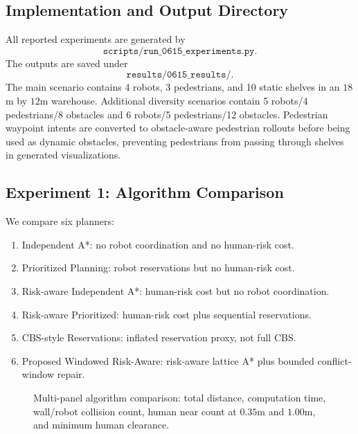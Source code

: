 \documentclass[10pt,twocolumn,letterpaper]{article}
\begin{document}
\subsection{Implementation and Output Directory}
All reported experiments are generated by
\begin{equation}
    \texttt{scripts/run\_0615\_experiments.py}.
\end{equation}
The outputs are saved under
\begin{equation}
    \texttt{results/0615\_results/}.
\end{equation}
The main scenario contains 4 robots, 3 pedestrians, and 10 static shelves in an $18$m by $12$m warehouse. Additional diversity scenarios contain 5 robots/4 pedestrians/8 obstacles and 6 robots/5 pedestrians/12 obstacles. Pedestrian waypoint intents are converted to obstacle-aware pedestrian rollouts before being used as dynamic obstacles, preventing pedestrians from passing through shelves in generated visualizations.

\subsection{Experiment 1: Algorithm Comparison}
We compare six planners:
\begin{enumerate}
    \item Independent A*: no robot coordination and no human-risk cost.
    \item Prioritized Planning: robot reservations but no human-risk cost.
    \item Risk-aware Independent A*: human-risk cost but no robot coordination.
    \item Risk-aware Prioritized: human-risk cost plus sequential reservations.
    \item CBS-style Reservations: inflated reservation proxy, not full CBS.
    \item Proposed Windowed Risk-Aware: risk-aware lattice A* plus bounded conflict-window repair.
\end{enumerate}

\begin{table}[t]
    \centering
    \caption{Algorithm comparison on the 4-robot / 3-pedestrian warehouse scenario. Insert \texttt{results/0615\_results/algorithm\_comparison.csv} or the rendered table image here.}
    \label{tab:algorithm_comparison}
\end{table}

\begin{figure}[t]
    \centering
    \caption{Multi-panel algorithm comparison: total distance, computation time, wall/robot collision count, human near count at $0.35$m and $1.00$m, and minimum human clearance.}
    \label{fig:algorithm_comparison}
\end{figure}
\end{document}
